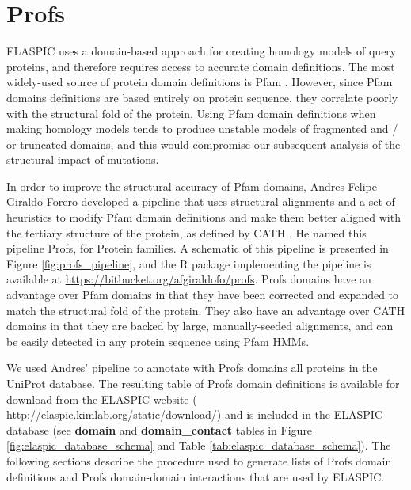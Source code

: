 
 \label{chap:implementation}


\section{Profs}

ELASPIC uses a domain-based approach for creating homology models of query proteins, and therefore requires access to accurate domain definitions. The most widely-used source of protein domain definitions is Pfam \cite{punta_pfam_2012}. However, since Pfam domains definitions are based entirely on protein sequence, they correlate poorly with the structural fold of the protein. Using Pfam domain definitions when making homology models tends to produce unstable models of fragmented and / or truncated domains, and this would compromise our subsequent analysis of the structural impact of mutations.

In order to improve the structural accuracy of Pfam domains, Andres Felipe Giraldo Forero developed a pipeline that uses structural alignments and a set of heuristics to modify Pfam domain definitions and make them better aligned with the tertiary structure of the protein, as defined by CATH \cite{cuff_extending_2011}. He named this pipeline Profs, for Protein families. A schematic of this pipeline is presented in Figure \ref{fig:profs_pipeline}, and the R package implementing the pipeline is available at \url{https://bitbucket.org/afgiraldofo/profs}. Profs domains have an advantage over Pfam domains in that they have been corrected and expanded to match the structural fold of the protein. They also have an advantage over CATH domains in that they are backed by large, manually-seeded alignments, and can be easily detected in any protein sequence using Pfam HMMs.

We used Andres' pipeline to annotate with Profs domains all proteins in the UniProt database. The resulting table of Profs domain definitions is available for download from the ELASPIC website ( \url{http://elaspic.kimlab.org/static/download/}) and is included in the ELASPIC database (see \textbf{domain} and \textbf{domain\_contact} tables in Figure \ref{fig:elaspic_database_schema} and Table \ref{tab:elaspic_database_schema}). The following sections describe the procedure used to generate lists of Profs domain definitions and Profs domain-domain interactions that are used by ELASPIC.

